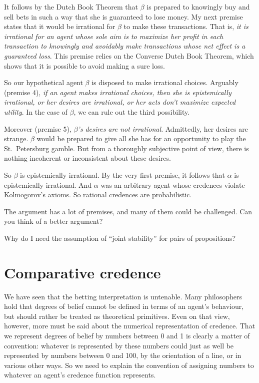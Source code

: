 It follows by the Dutch Book Theorem that $\beta$ is prepared to
knowingly buy and sell bets in such a way that she is guaranteed to
lose money. My next premise states that it would be irrational for
$\beta$ to make these transactions. That is, \emph{it is irrational
  for an agent whose sole aim is to maximize her profit in each
  transaction to knowingly and avoidably make transactions whose net
  effect is a guaranteed loss}. This premise relies on the Converse
Dutch Book Theorem, which shows that it is possible to avoid making a
sure loss.

So our hypothetical agent $\beta$ is disposed to make irrational
choices. Arguably (premise 4), \emph{if an agent makes irrational
  choices, then she is epistemically irrational, or her desires are
  irrational, or her acts don't maximize expected utility}. In the
case of $\beta$, we can rule out the third possibility.

Moreover (premise 5), \emph{$\beta$'s desires are not irrational}.
Admittedly, her desires are strange. $\beta$ would be prepared
to give all she has for an opportunity to play the St.\ Petersburg
gamble. But from a thoroughly subjective point of view, there is
nothing incoherent or inconsistent about these desires.

So $\beta$ is epistemically irrational. By the very first premise, it
follows that $\alpha$ is epistemically irrational. And $\alpha$ was an
arbitrary agent whose credences violate Kolmogorov's axioms. So
rational credences are probabilistic.

The argument has a lot of premises, and many of them could be
challenged. Can you think of a better argument?

\begin{exercise}{3}
  Why do I need the assumption of ``joint stability'' for pairs of
  propositions?
\end{exercise}



\section{Comparative credence}\label{sec:comparative-credence}

We have seen that the betting interpretation is untenable. Many
philosophers hold that degrees of belief cannot be defined in terms of
an agent's behaviour, but should rather be treated as theoretical
primitives. Even on that view, however, more must be said about the
numerical representation of credence. That we represent degrees of
belief by numbers between 0 and 1 is clearly a matter of convention:
whatever is represented by these numbers could just as well be
represented by numbers between 0 and 100, by the orientation of a line,
or in various other ways. So we need to explain the convention of
assigning numbers to whatever an agent's credence function represents.

